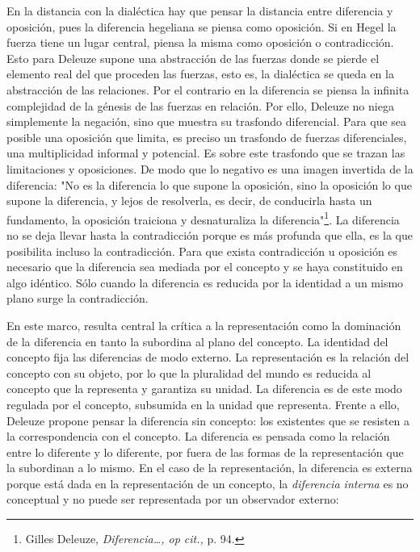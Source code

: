 \documentclass{book}
\begin{document}
En la distancia con la dialéctica hay que pensar la distancia entre
diferencia y oposición, pues la diferencia hegeliana se piensa como
oposición. Si en Hegel la fuerza tiene un lugar central, piensa la misma
como oposición o contradicción. Esto para Deleuze supone una abstracción
de las fuerzas donde se pierde el elemento real del que proceden las
fuerzas, esto es, la dialéctica se queda en la abstracción de las
relaciones. Por el contrario en la diferencia se piensa la infinita
complejidad de la génesis de las fuerzas en relación. Por ello, Deleuze
no niega simplemente la negación, sino que muestra su trasfondo
diferencial. Para que sea posible una oposición que limita, es preciso
un trasfondo de fuerzas diferenciales, una multiplicidad informal y
potencial. Es sobre este trasfondo que se trazan las limitaciones y
oposiciones. De modo que lo negativo es una imagen invertida de la
diferencia: "No es la diferencia lo que supone la oposición, sino la
oposición lo que supone la diferencia, y lejos de resolverla, es decir,
de conducirla hasta un fundamento, la oposición traiciona y
desnaturaliza la diferencia"\footnote{Gilles Deleuze,
  \emph{Diferencia\ldots, op cit.,} p. 94.}. La diferencia no se deja
llevar hasta la contradicción porque es más profunda que ella, es la que
posibilita incluso la contradicción. Para que exista contradicción u
oposición es necesario que la diferencia sea mediada por el concepto y
se haya constituido en algo idéntico. Sólo cuando la diferencia es
reducida por la identidad a un mismo plano surge la contradicción.

En este marco, resulta central la crítica a la representación como la
dominación de la diferencia en tanto la subordina al plano del concepto.
La identidad del concepto fija las diferencias de modo externo. La
representación es la relación del concepto con su objeto, por lo que la
pluralidad del mundo es reducida al concepto que la representa y
garantiza su unidad. La diferencia es de este modo regulada por el
concepto, subsumida en la unidad que representa. Frente a ello, Deleuze
propone pensar la diferencia sin concepto: los existentes que se
resisten a la correspondencia con el concepto. La diferencia es pensada
como la relación entre lo diferente y lo diferente, por fuera de las
formas de la representación que la subordinan a lo mismo. En el caso de
la representación, la diferencia es externa porque está dada en la
representación de un concepto, la \emph{diferencia interna} es no
conceptual y no puede ser representada por un observador externo:
\end{document}

